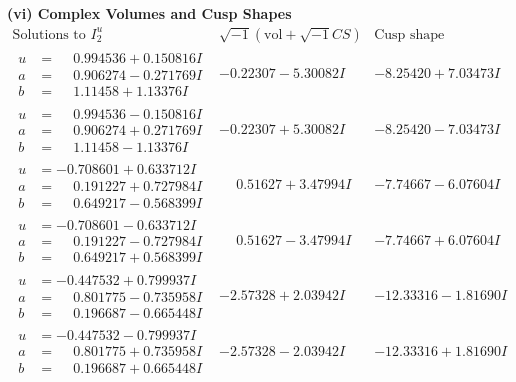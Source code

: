 \documentclass[1p]{elsarticle_modified}
\theoremstyle{definition}
\newcommand{\I}{\sqrt{-1}}
\begin{document}
\newpage\flushleft \textbf{(vi) Complex Volumes and Cusp Shapes}
$$\begin{array}{c|c|c}  
\text{Solutions to }I^u_{2}& \I (\text{vol} + \sqrt{-1}CS) & \text{Cusp shape}\\
 \hline 
\begin{aligned}
u &= \phantom{-}0.994536 + 0.150816 I \\
a &= \phantom{-}0.906274 - 0.271769 I \\
b &= \phantom{-}1.11458 + 1.13376 I\end{aligned}
 & -0.22307 - 5.30082 I & -8.25420 + 7.03473 I \\ \hline\begin{aligned}
u &= \phantom{-}0.994536 - 0.150816 I \\
a &= \phantom{-}0.906274 + 0.271769 I \\
b &= \phantom{-}1.11458 - 1.13376 I\end{aligned}
 & -0.22307 + 5.30082 I & -8.25420 - 7.03473 I \\ \hline\begin{aligned}
u &= -0.708601 + 0.633712 I \\
a &= \phantom{-}0.191227 + 0.727984 I \\
b &= \phantom{-}0.649217 - 0.568399 I\end{aligned}
 & \phantom{-}0.51627 + 3.47994 I & -7.74667 - 6.07604 I \\ \hline\begin{aligned}
u &= -0.708601 - 0.633712 I \\
a &= \phantom{-}0.191227 - 0.727984 I \\
b &= \phantom{-}0.649217 + 0.568399 I\end{aligned}
 & \phantom{-}0.51627 - 3.47994 I & -7.74667 + 6.07604 I \\ \hline\begin{aligned}
u &= -0.447532 + 0.799937 I \\
a &= \phantom{-}0.801775 - 0.735958 I \\
b &= \phantom{-}0.196687 - 0.665448 I\end{aligned}
 & -2.57328 + 2.03942 I & -12.33316 - 1.81690 I \\ \hline\begin{aligned}
u &= -0.447532 - 0.799937 I \\
a &= \phantom{-}0.801775 + 0.735958 I \\
b &= \phantom{-}0.196687 + 0.665448 I\end{aligned}
 & -2.57328 - 2.03942 I & -12.33316 + 1.81690 I \\ \hline\begin{aligned}

\end{aligned}
\end{array}$$
\end{document}
